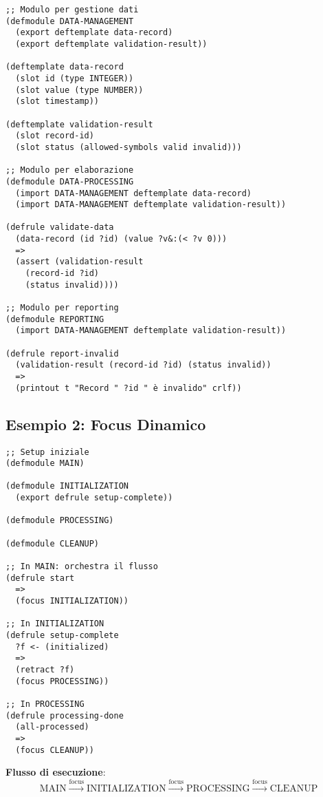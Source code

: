 \begin{lstlisting}[language=CLIPS]
;; Modulo per gestione dati
(defmodule DATA-MANAGEMENT
  (export deftemplate data-record)
  (export deftemplate validation-result))

(deftemplate data-record
  (slot id (type INTEGER))
  (slot value (type NUMBER))
  (slot timestamp))

(deftemplate validation-result
  (slot record-id)
  (slot status (allowed-symbols valid invalid)))

;; Modulo per elaborazione
(defmodule DATA-PROCESSING
  (import DATA-MANAGEMENT deftemplate data-record)
  (import DATA-MANAGEMENT deftemplate validation-result))

(defrule validate-data
  (data-record (id ?id) (value ?v&:(< ?v 0)))
  =>
  (assert (validation-result 
    (record-id ?id) 
    (status invalid))))

;; Modulo per reporting
(defmodule REPORTING
  (import DATA-MANAGEMENT deftemplate validation-result))

(defrule report-invalid
  (validation-result (record-id ?id) (status invalid))
  =>
  (printout t "Record " ?id " è invalido" crlf))
\end{lstlisting}

\subsection{Esempio 2: Focus Dinamico}

\begin{lstlisting}[language=CLIPS]
;; Setup iniziale
(defmodule MAIN)

(defmodule INITIALIZATION
  (export defrule setup-complete))

(defmodule PROCESSING)

(defmodule CLEANUP)

;; In MAIN: orchestra il flusso
(defrule start
  =>
  (focus INITIALIZATION))

;; In INITIALIZATION
(defrule setup-complete
  ?f <- (initialized)
  =>
  (retract ?f)
  (focus PROCESSING))

;; In PROCESSING  
(defrule processing-done
  (all-processed)
  =>
  (focus CLEANUP))
\end{lstlisting}

\textbf{Flusso di esecuzione}:
\begin{equation}
\text{MAIN} \xrightarrow{\text{focus}} \text{INITIALIZATION} \xrightarrow{\text{focus}} \text{PROCESSING} \xrightarrow{\text{focus}} \text{CLEANUP}
\end{equation}

